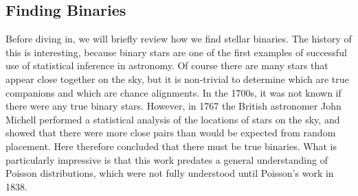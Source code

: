 \subsection{Finding Binaries}

Before diving in, we will briefly review how we find stellar binaries. The history of this is interesting, because binary stars are one of the first examples of successful use of statistical inference in astronomy. Of course there are many stars that appear close together on the sky, but it is non-trivial to determine which are true companions and which are chance alignments. In the 1700s, it was not known if there were any true binary stars. However, in 1767 the British astronomer John Michell performed a statistical analysis of the locations of stars on the sky, and showed that there were more close pairs than would be expected from random placement. Here therefore concluded that there must be true binaries. What is particularly impressive is that this work predates a general understanding of Poisson distributions, which were not fully understood until Poisson's work in 1838.


